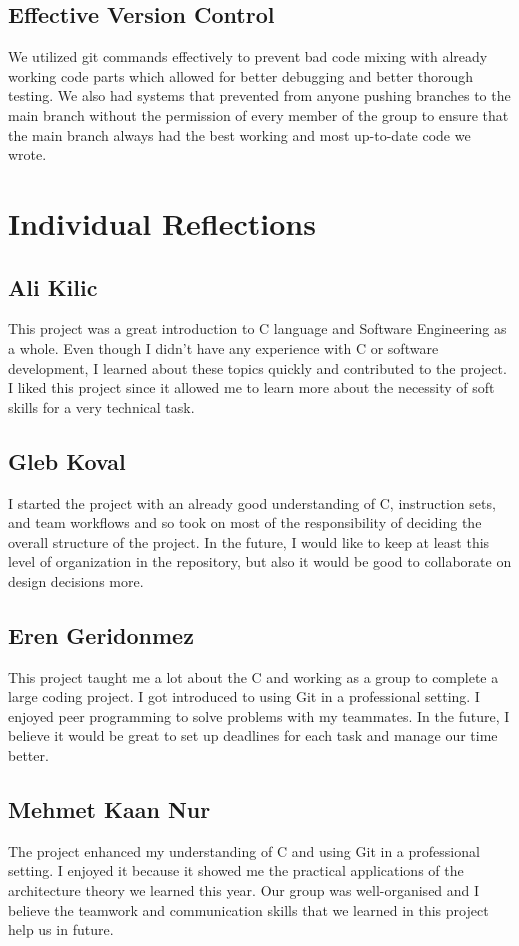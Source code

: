 \documentclass[11pt]{article}
\begin{document}
\subsection{Effective Version Control}
We utilized git commands effectively to prevent bad code mixing with already working code parts which allowed for better debugging and better thorough testing. We also had systems that prevented from anyone pushing branches to the main branch without the permission of every member of the group to ensure that the main branch always had the best working and most up-to-date code we wrote. 


\section{Individual Reflections}

\subsection{Ali Kilic}
This project was a great introduction to C language and Software Engineering as a whole. Even though I didn’t have any experience with C or software development, I learned about these topics quickly and contributed to the project. I liked this project since it allowed me to learn more about the necessity of soft skills for a very technical task. 

\subsection{Gleb Koval}
I started the project with an already good understanding of C, instruction sets, and team workflows and so took on most of the responsibility of deciding the overall structure of the project. In the future, I would like to keep at least this level of organization in the repository, but also it would be good to collaborate on design decisions more.

\subsection{Eren Geridonmez}
This project taught me a lot about the C and working as a group to complete a large coding project. I got introduced to using Git in a professional setting. I enjoyed peer programming to solve problems with my teammates. In the future, I believe it would be great to set up deadlines for each task and manage our time better.

\subsection{Mehmet Kaan Nur}
The project enhanced my understanding of C and using Git in a professional setting. I enjoyed it because it showed me the practical applications of the architecture theory we learned this year. Our group was well-organised and I believe the teamwork and communication skills that we learned in this project help us in future.
\end{document}

